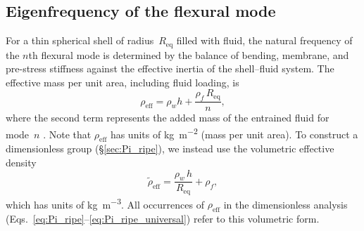 
\subsection{Eigenfrequency of the flexural mode}
\label{sec:eigenfreq}

For a thin spherical shell of radius~$R_{\mathrm{eq}}$ filled with
fluid, the natural frequency of the $n$th flexural mode is determined
by the balance of bending, membrane, and pre-stress stiffness against
the effective inertia of the shell--fluid system.  The effective mass
per unit area, including fluid loading, is
\begin{equation}
  \rho_{\mathrm{eff}} = \rho_w h + \frac{\rho_f\, R_{\mathrm{eq}}}{n},
  \label{eq:rho_eff}
\end{equation}
where the second term represents the added mass of the entrained fluid
for mode~$n$ \cite{Junger1986, lamb1882}.  Note that
$\rho_{\mathrm{eff}}$ has units of
\si{\kilogram\per\metre\squared} (mass per unit area).  To construct a
dimensionless group (\S\ref{sec:Pi_ripe}), we instead use
the volumetric effective density
\begin{equation}
  \tilde{\rho}_{\mathrm{eff}} = \frac{\rho_w\, h}{R_{\mathrm{eq}}} + \rho_f,
  \label{eq:rho_eff_vol}
\end{equation}
which has units of \si{\kilogram\per\metre\cubed}.  All occurrences of
$\rho_{\mathrm{eff}}$ in the dimensionless analysis
(Eqs.~\ref{eq:Pi_ripe}--\ref{eq:Pi_ripe_universal}) refer to this
volumetric form.


